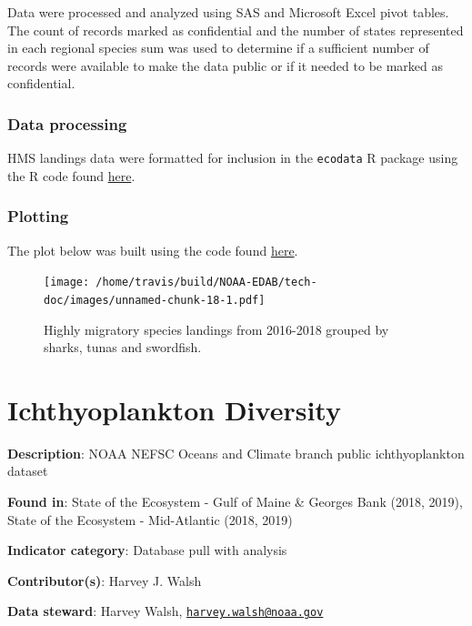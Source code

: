 \documentclass[
]{book}
\begin{document}
Data were processed and analyzed using SAS and Microsoft Excel pivot tables. The count of records marked as confidential and the number of states represented in each regional species sum was used to determine if a sufficient number of records were available to make the data public or if it needed to be marked as confidential.

\hypertarget{data-processing-13}{%
\subsection{Data processing}\label{data-processing-13}}

HMS landings data were formatted for inclusion in the \texttt{ecodata} R package using the R code found \href{https://github.com/NOAA-EDAB/ecodata/blob/master/data-raw/get_hms_landings.R}{here}.

\hypertarget{plotting-12}{%
\subsection{Plotting}\label{plotting-12}}

The plot below was built using the code found
\href{https://github.com/NOAA-EDAB/ecodata/blob/master/chunk-scripts/human_dimensions.Rmd-comm_landings.R}{here}.

\begin{figure}
\centering
\texttt{[image: /home/travis/build/NOAA-EDAB/tech-doc/images/unnamed-chunk-18-1.pdf]}
\caption{\label{fig:unnamed-chunk-18}Highly migratory species landings from 2016-2018 grouped by sharks, tunas and swordfish.}
\end{figure}

\hypertarget{ichthyoplankton-diversity}{%
\chapter{Ichthyoplankton Diversity}\label{ichthyoplankton-diversity}}

\textbf{Description}: NOAA NEFSC Oceans and Climate branch public ichthyoplankton dataset

\textbf{Found in}: State of the Ecosystem - Gulf of Maine \& Georges Bank (2018, 2019), State of the Ecosystem - Mid-Atlantic (2018, 2019)

\textbf{Indicator category}: Database pull with analysis

\textbf{Contributor(s)}: Harvey J. Walsh

\textbf{Data steward}: Harvey Walsh, \href{mailto:harvey.walsh@noaa.gov}{\nolinkurl{harvey.walsh@noaa.gov}}
\end{document}
